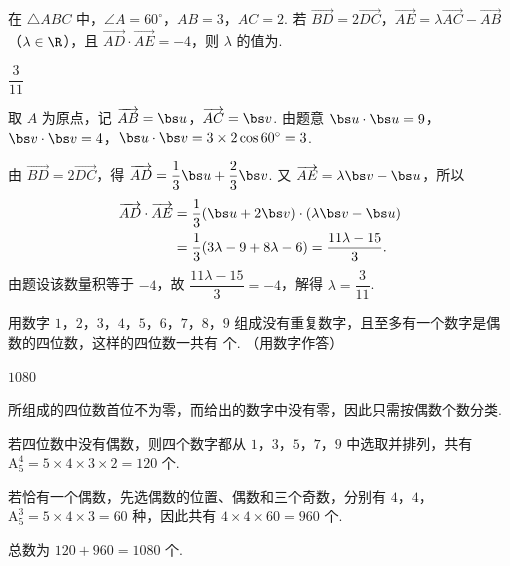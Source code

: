 \begin{problem}
在 \(\triangle ABC\) 中，\(\angle A=60^\circ\)，\(AB=3\)，\(AC=2\). 若 \(\overrightarrow{BD}=2\overrightarrow{DC}\)，\(\overrightarrow{AE}=\lambda\overrightarrow{AC}-\overrightarrow{AB}\)（\(\lambda\in\R\)），且 \(\overrightarrow{AD}\cdot\overrightarrow{AE}=-4\)，则 \(\lambda\) 的值为\fillinblank{}.
\end{problem}

\begin{answer}
\(\dfrac{3}{11}\)
\end{answer}

\begin{solution}
取 \(A\) 为原点，记 \(\overrightarrow{AB}=\bs u\)，\(\overrightarrow{AC}=\bs v\). 由题意
\(\bs u\cdot\bs u=9\)，\(\bs v\cdot\bs v=4\)，\(\bs u\cdot\bs v=3\times2\cos60^\circ=3\).

由 \(\overrightarrow{BD}=2\overrightarrow{DC}\)，得
\(\overrightarrow{AD}=\dfrac13\bs u+\dfrac23\bs v\). 又
\(\overrightarrow{AE}=\lambda\bs v-\bs u\)，所以
\[
\begin{aligned}
\overrightarrow{AD}\cdot\overrightarrow{AE}
&=\frac13(\bs u+2\bs v)\cdot(\lambda\bs v-\bs u)\\
&=\frac13(3\lambda-9+8\lambda-6)=\frac{11\lambda-15}{3}.
\end{aligned}
\]
由题设该数量积等于 \(-4\)，故 \(\dfrac{11\lambda-15}{3}=-4\)，解得
\(\lambda=\dfrac3{11}\).
\end{solution}

\begin{problem}
用数字 \(1\)，\(2\)，\(3\)，\(4\)，\(5\)，\(6\)，\(7\)，\(8\)，\(9\) 组成没有重复数字，且至多有一个数字是偶数的四位数，这样的四位数一共有\fillinblank{} 个. （用数字作答）
\end{problem}

\begin{answer}
\(1080\)
\end{answer}

\begin{solution}
所组成的四位数首位不为零，而给出的数字中没有零，因此只需按偶数个数分类.

若四位数中没有偶数，则四个数字都从 \(1\)，\(3\)，\(5\)，\(7\)，\(9\) 中选取并排列，共有
\(\mathrm A_5^4=5\times4\times3\times2=120\) 个.

若恰有一个偶数，先选偶数的位置、偶数和三个奇数，分别有 \(4\)，\(4\)，\(\mathrm A_5^3=5\times4\times3=60\) 种，因此共有
\(4\times4\times60=960\) 个.

总数为 \(120+960=1080\) 个.
\end{solution}

